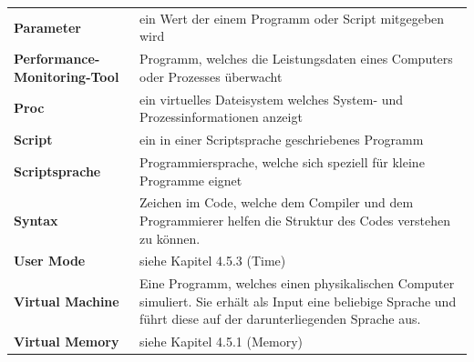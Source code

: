 \documentclass{fancydocument}
\begin{document}
\begin{tabularx}{\linewidth}{p{6.5cm}X}
\textbf{Parameter}&ein Wert der einem Programm oder Script mitgegeben wird\\
\textbf{Performance-Monitoring-Tool}&Programm, welches die Leistungsdaten eines Computers oder Prozesses überwacht\\
\textbf{Proc}&ein virtuelles Dateisystem welches System- und Prozessinformationen anzeigt\\
\textbf{Script}&ein in einer Scriptsprache geschriebenes Programm\\
\textbf{Scriptsprache}&Programmiersprache, welche sich speziell für kleine Programme eignet\\
\textbf{Syntax}&Zeichen im Code, welche dem Compiler und dem Programmierer helfen die Struktur des Codes verstehen zu k\"onnen.\\
\textbf{User Mode}&siehe Kapitel 4.5.3 (Time)\\
\textbf{Virtual Machine}&Eine Programm, welches einen physikalischen Computer simuliert. Sie erhält als Input eine beliebige Sprache und führt
diese auf der darunterliegenden Sprache aus.\\
\textbf{Virtual Memory}&siehe Kapitel 4.5.1 (Memory)\\


\end{tabularx}
\end{document}
